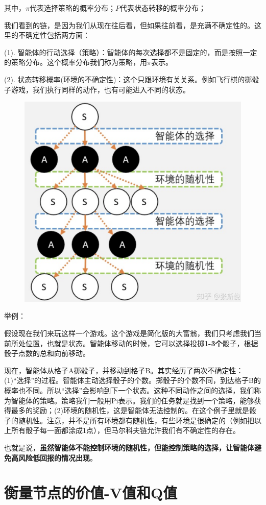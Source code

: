 \documentclass[12pt]{article}
\begin{document}
其中，$\pi$代表选择策略的概率分布；$P$代表状态转移的概率分布；

我们看到的链，是因为我们从现在往后看，但如果往前看，是充满不确定性的。这里的不确定性包括两方面：

(1). 智能体的行动选择（策略）：智能体的每次选择都不是固定的，而是按照一定的策略分布。这个概率分布我们称为策略，用$\pi$表示。

(2). 状态转移概率(环境的不确定性)：这个只跟环境有关关系。例如飞行棋的掷骰子游戏，我们执行同样的动作，也有可能进入不同的状态。

\begin{figure}[H]
    \centering
    \includegraphics[width=.5\textwidth]{fig/ReinforcementLearning/RL_Markov_Chain_Tree_Uncertainty.png}
\end{figure}

\begin{framed}
\small{
举例：

假设现在我们来玩这样一个游戏。这个游戏是简化版的大富翁，我们只考虑我们当前所处位置，也就是状态。智能体移动的时候，它可以选择投掷\textbf{1-3个}骰子，根据骰子点数的总和向前移动。

现在，智能体从格子A掷骰子，并移动到格子B。其实经历了两次不确定性：(1)“选择”的过程。智能体主动选择骰子的个数。掷骰子的个数不同，到达格子B的概率也不同。所以“选择”会影响到下一个状态。这种不同动作之间的选择，我们称为智能体的策略。策略我们一般用Pi表示。我们的任务就是找到一个策略，能够获得最多的奖励；(2)环境的随机性，这是智能体无法控制的。在这个例子里就是骰子的随机性。注意，并不是所有环境都有随机性，有些环境是很确定的（例如把以上所有骰子每一面都涂成1点），但马尔科夫链允许我们有不确定性的存在。

也就是说，\textbf{虽然智能体不能控制环境的随机性，但能控制策略的选择，让智能体避免高风险低回报的情况出现}。
}
\end{framed}

\section{衡量节点的价值-V值和Q值\cite{How_To_Understand_Q_V_Value}}
\end{document}
